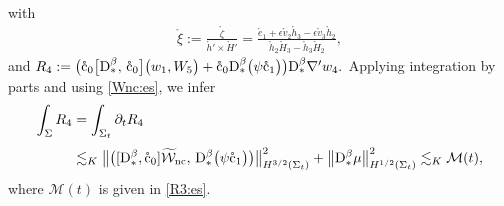 \documentclass[twoside,11pt]{article}
\numberwithin{equation}{section}
\def\p{\partial}
\begin{document}
with
\begin{align} \label{xi.ring:def}
	\mathring{\xi}:=\frac{\mathring{\zeta}}{\mathring{h}'\times \mathring{H}'}
	=\frac{\mathring{e}_1+\epsilon \mathring{v}_2\mathring{h}_3-\epsilon \mathring{v}_3\mathring{h}_2}{\mathring{h}_2\mathring{H}_3 -\mathring{h}_3\mathring{H}_2},
\end{align}
and
$
	R_4:= \big(\mathring{\rm c}_0
	\big[\mathrm{D}_*^{\beta},\,\mathring{\rm c}_0\big]
	\big(w_1, W_5\big)   +
 \mathring{\rm c}_0\mathrm{D}_*^{\beta}\big(\psi \mathring{\rm c}_1\big)\big)\mathrm{D}_*^{\beta}\nabla'{w_4}.
$
Applying integration by parts  and using \eqref{Wnc:es}, we infer
\begin{align}
 \int_{\Sigma} R_4 &=\int_{\Sigma_t} \p_t R_4 \nonumber\\[1mm]
& 	\lesssim_K
\big\| \big([\mathrm{D}_*^{\beta},\mathring{\rm c}_0]\widetilde{\mathcal{W}}_{\rm nc},\,
\mathrm{D}_*^{\beta}\big(\psi \mathring{\rm c}_1\big)
\big) \big\|_{H^{3/2}(\Sigma_{t})}^2
+\big\| \mathrm{D}_*^{\beta}\mu \big\|_{H^{1/2}(\Sigma_{t})}^2	
\lesssim_K \mathcal{M}(t), \label{R4:es}
\end{align}
where $\mathcal{M}(t)$ is given in \eqref{R3:es}.
\end{document}
